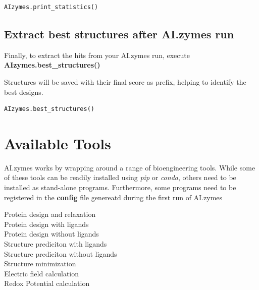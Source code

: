 \documentclass[10pt]{extarticle}
\let\oldsection\section
\renewcommand{\section}[1]{\clearpage\oldsection{#1}}
\begin{document}
\vspace*{0.5\baselineskip}
\begin{lstlisting}[basicstyle=\color{black}\fontsize{9}{11}\selectfont\ttfamily, frame=single, rulecolor=\color{black}, breaklines=true]
AIzymes.print_statistics()
\end{lstlisting}
\vspace*{0.5\baselineskip}

\subsection{Extract best structures after AI.zymes run}

Finally, to extract the hits from your AI.zymes run, execute \textbf{AIzymes.best\_structures()}

\begin{tcolorbox}[colback=mpgAccentBlue!20!white,colframe=mpgAccentBlue!80!black,title=Note]
Structures will be saved with their final score as prefix, helping to identify the best designs.
\end{tcolorbox}

\vspace*{0.5\baselineskip}
\begin{lstlisting}[basicstyle=\color{black}\fontsize{9}{11}\selectfont\ttfamily, frame=single, rulecolor=\color{black}, breaklines=true]
AIzymes.best_structures()      
\end{lstlisting}
\vspace*{0.5\baselineskip}\section{Available Tools}

AI.zymes works by wrapping around a range of bioengineering tools. While some of these tools can be readily installed using \textit{pip} or \textit{conda}, others need to be installed as stand-alone programs. Furthermore, some programs need to be registered in the \textbf{config} file genereatd during the first run of AI.zymes

 Protein design and relaxation \\        
 Protein design with ligands \\    
 Protein design without ligands \\  
 Structure prediciton with ligands \\ 
 Structure prediciton without ligands \\
 Structure minimization \\
 Electric field calculation \\        
 Redox Potential calculation \\
\end{document}
